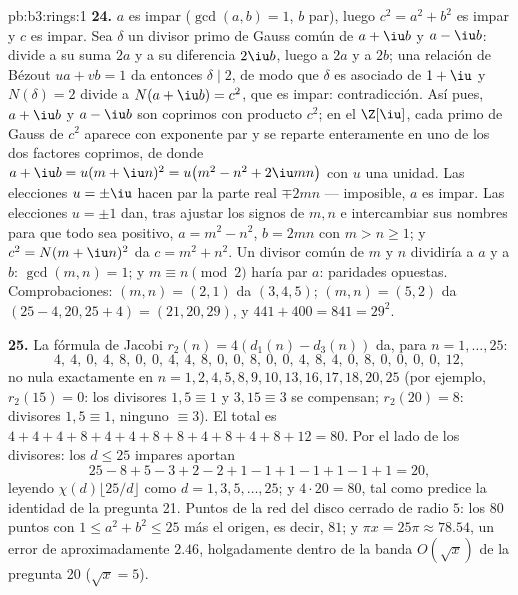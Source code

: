 \begin{solution}{pb:b3:rings:1}
\textbf{24.} $a$ es impar ($\gcd(a, b) = 1$, $b$ par), luego $c^2
= a^2 + b^2$ es impar y $c$ es impar. Sea $\delta$ un divisor primo de
Gauss común de $a + \iu b$ y $a - \iu b$: divide a su suma $2a$ y a su
diferencia $2\iu b$, luego a $2a$ y a $2b$; una relación de Bézout
$ua + vb = 1$ da entonces $\delta \mid 2$, de modo que $\delta$ es
asociado de $1 + \iu$ y $N(\delta) = 2$ divide a $N(a + \iu b) = c^2$,
que es impar: contradicción. Así pues, $a + \iu b$ y $a - \iu b$ son
coprimos con producto $c^2$; en el 
$\Z[\iu]$, cada primo de Gauss de $c^2$ aparece con exponente par y se
reparte enteramente en uno de los dos factores coprimos, de donde
$a + \iu b = u(m + \iu
n)^2 = u\bigl(m^2 - n^2 + 2\iu mn\bigr)$ con $u$ una unidad. Las
elecciones $u = \pm\iu$ hacen par la parte real $\mp 2mn$ --- imposible,
$a$ es impar. Las elecciones $u = \pm1$ dan, tras ajustar los signos de
$m, n$ e intercambiar sus nombres para que todo sea positivo,
$a = m^2 - n^2$, $b = 2mn$ con $m > n
\geq 1$; y $c^2 = N(m + \iu n)^2$ da $c = m^2 + n^2$. Un divisor común
de $m$ y $n$ dividiría a $a$ y a $b$: $\gcd
(m, n) = 1$; y $m \equiv n \pmod 2$ haría par $a$: paridades opuestas.
Comprobaciones: $(m, n) = (2, 1)$ da $(3, 4,
5)$; $(m, n) = (5, 2)$ da $(25 - 4, 20, 25 + 4) = (21, 20,
29)$, y $441 + 400 = 841 = 29^2$.

\textbf{25.} La fórmula de Jacobi $r_2(n) = 4(d_1(n) - d_3(n))$ da, para
$n = 1, \dots, 25$:
\[
4,\ 4,\ 0,\ 4,\ 8,\ 0,\ 0,\ 4,\ 4,\ 8,\ 0,\ 0,\ 8,\ 0,\ 0,\
4,\ 8,\ 4,\ 0,\ 8,\ 0,\ 0,\ 0,\ 0,\ 12,
\]
no nula exactamente en $n = 1, 2, 4, 5, 8, 9, 10, 13, 16, 17, 18,
20, 25$ (por ejemplo, $r_2(15) = 0$: los divisores $1, 5 \equiv 1$ y
$3, 15 \equiv 3$ se compensan; $r_2(20) = 8$: divisores $1, 5
\equiv 1$, ninguno $\equiv 3$). El total es $4 + 4 + 4 + 8 + 4 +
4 + 8 + 8 + 4 + 8 + 4 + 8 + 12 = 80$. Por el lado de los divisores: los
$d \leq 25$ impares aportan
\[
25 - 8 + 5 - 3 + 2 - 2 + 1 - 1 + 1 - 1 + 1 - 1 + 1 = 20,
\]
leyendo $\chi(d)\lfloor 25/d\rfloor$ como $d = 1, 3, 5, \dots,
25$; y $4 \cdot 20 = 80$, tal como predice la identidad de la pregunta
21. Puntos de la red del disco cerrado de radio $5$: los $80$ puntos con
$1 \leq a^2 + b^2 \leq 25$ más el origen, es decir, $81$; y
$\pi x = 25\pi \approx 78.54$, un error de aproximadamente $2.46$,
holgadamente dentro de la banda $O(\sqrt x)$ de la pregunta 20
($\sqrt x = 5$).
\end{solution}
